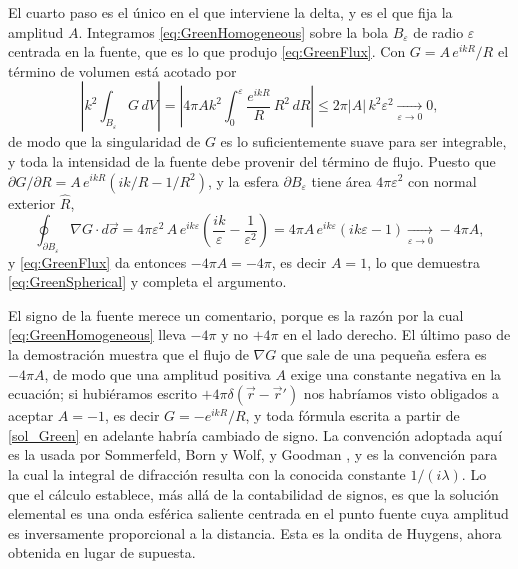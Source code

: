 		El cuarto paso es el único en el que interviene la delta, y es el que fija la amplitud $A$. Integramos \eqref{eq:GreenHomogeneous} sobre la bola $B_{\varepsilon}$ de radio $\varepsilon$ centrada en la fuente, que es lo que produjo \eqref{eq:GreenFlux}. Con $G = A\,e^{ikR}/R$ el término de volumen está acotado por
		\begin{equation*}
			\left|k^{2}\int_{B_{\varepsilon}} G\, dV\right| = \left|4\pi A k^{2}\int_{0}^{\varepsilon} \frac{e^{ikR}}{R}\,R^{2}\,dR\right| \leq 2\pi |A|\,k^{2}\varepsilon^{2} \xrightarrow[\varepsilon\to 0]{} 0,
		\end{equation*}
		de modo que la singularidad de $G$ es lo suficientemente suave para ser integrable, y toda la intensidad de la fuente debe provenir del término de flujo. Puesto que $\partial G/\partial R = A\,e^{ikR}\left(ik/R - 1/R^{2}\right)$, y la esfera $\partial B_{\varepsilon}$ tiene área $4\pi\varepsilon^{2}$ con normal exterior $\hat{R}$,
		\begin{equation*}
			\oint_{\partial B_{\varepsilon}} \nabla G\cdot d\vec{\sigma} = 4\pi\varepsilon^{2}\,A\,e^{ik\varepsilon}\left(\frac{ik}{\varepsilon}-\frac{1}{\varepsilon^{2}}\right) = 4\pi A\,e^{ik\varepsilon}\left(ik\varepsilon - 1\right) \xrightarrow[\varepsilon\to 0]{} -4\pi A ,
		\end{equation*}
		y \eqref{eq:GreenFlux} da entonces $-4\pi A = -4\pi$, es decir $A = 1$, lo que demuestra \eqref{eq:GreenSpherical} y completa el argumento.

		El signo de la fuente merece un comentario, porque es la razón por la cual \eqref{eq:GreenHomogeneous} lleva $-4\pi$ y no $+4\pi$ en el lado derecho. El último paso de la demostración muestra que el flujo de $\nabla G$ que sale de una pequeña esfera es $-4\pi A$, de modo que una amplitud positiva $A$ exige una constante negativa en la ecuación; si hubiéramos escrito $+4\pi\delta(\vec{r}-\vec{r}')$ nos habríamos visto obligados a aceptar $A = -1$, es decir $G = -e^{ikR}/R$, y toda fórmula escrita a partir de \eqref{sol_Green} en adelante habría cambiado de signo. La convención adoptada aquí es la usada por Sommerfeld, Born y Wolf, y Goodman \citep{sommerfeld1954optics, born1999principles, goodman2005introduction}, y es la convención para la cual la integral de difracción resulta con la conocida constante $1/(i\lambda)$. Lo que el cálculo establece, más allá de la contabilidad de signos, es que la solución elemental es una onda esférica saliente centrada en el punto fuente cuya amplitud es inversamente proporcional a la distancia. Esta es la ondita de Huygens, ahora obtenida en lugar de supuesta.

